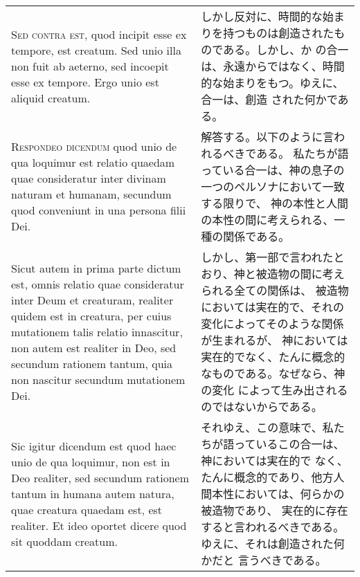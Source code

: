 \documentclass[10pt]{jsarticle} %
\begin{document}
\begin{longtable}{p{21em}p{21em}}
{\scshape Sed contra est}, quod incipit esse ex tempore, est creatum. Sed unio illa
non fuit ab aeterno, sed incoepit esse ex tempore. Ergo unio est aliquid
creatum.


&


しかし反対に、時間的な始まりを持つものは創造されたものである。しかし、か
 の合一は、永遠からではなく、時間的な始まりをもつ。ゆえに、合一は、創造
 された何かである。

\\



{\scshape Respondeo dicendum} quod unio de qua loquimur est relatio quaedam quae
consideratur inter divinam naturam et humanam, secundum quod conveniunt
in una persona filii Dei. 


&

解答する。以下のように言われるべきである。
私たちが語っている合一は、神の息子の一つのペルソナにおいて一致する限りで、
 神の本性と人間の本性の間に考えられる、一種の関係である。

\\

Sicut autem in prima parte dictum est, omnis
relatio quae consideratur inter Deum et creaturam, realiter quidem est
in creatura, per cuius mutationem talis relatio innascitur, non autem
est realiter in Deo, sed secundum rationem tantum, quia non nascitur
secundum mutationem Dei. 


&

しかし、第一部で言われたとおり、神と被造物の間に考えられる全ての関係は、
 被造物においては実在的で、それの変化によってそのような関係が生まれるが、
 神においては実在的でなく、たんに概念的なものである。なぜなら、神の変化
 によって生み出されるのではないからである。


\\


Sic igitur dicendum est quod haec unio de qua
loquimur, non est in Deo realiter, sed secundum rationem tantum in
humana autem natura, quae creatura quaedam est, est realiter. Et ideo
oportet dicere quod sit quoddam creatum.


&

それゆえ、この意味で、私たちが語っているこの合一は、神においては実在的で
 なく、たんに概念的であり、他方人間本性においては、何らかの被造物であり、
 実在的に存在すると言われるべきである。ゆえに、それは創造された何かだと
 言うべきである。


\\




\end{longtable}
\end{document}
